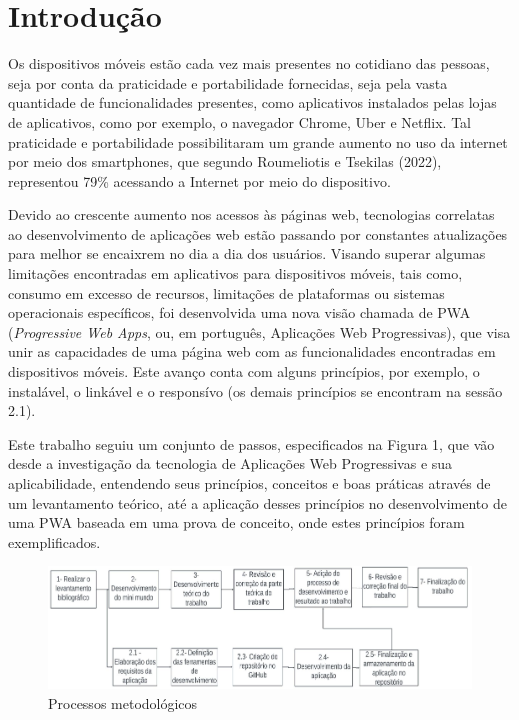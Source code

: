 \documentclass[12pt]{article}
\begin{document}
\section{Introdução}

Os dispositivos móveis estão cada vez mais presentes no cotidiano das pessoas, seja por conta da praticidade e portabilidade fornecidas, seja pela vasta quantidade de funcionalidades presentes, como aplicativos instalados pelas lojas de aplicativos, como por exemplo, o navegador Chrome, Uber e Netflix. Tal praticidade e portabilidade possibilitaram um grande aumento no uso da internet por meio dos smartphones, que segundo Roumeliotis e Tsekilas (2022), representou 79\% acessando a Internet por meio do dispositivo.

Devido ao crescente aumento nos acessos às páginas web, tecnologias correlatas ao desenvolvimento de aplicações web estão passando por constantes atualizações para melhor se encaixrem no dia a dia dos usuários. Visando superar algumas limitações encontradas em aplicativos para dispositivos móveis, tais como, consumo em excesso de recursos, limitações de plataformas ou sistemas operacionais específicos, foi desenvolvida uma nova visão chamada de PWA (\textit{Progressive Web Apps}, ou, em português, Aplicações Web Progressivas), que visa unir as capacidades de uma página web com as funcionalidades encontradas em dispositivos móveis. Este avanço conta com alguns princípios, por exemplo, o instalável, o linkável e o responsívo (os demais princípios se encontram na sessão 2.1).

Este trabalho seguiu um conjunto de passos, especificados na Figura 1, que vão desde a investigação da tecnologia de Aplicações Web Progressivas e sua aplicabilidade, entendendo seus princípios, conceitos e boas práticas através de um levantamento teórico, até a aplicação desses princípios no desenvolvimento de uma PWA baseada em uma prova de conceito, onde estes princípios foram exemplificados.

\begin{figure}[ht]
\centering
\includegraphics[width=1\textwidth]{imagens/processos.png}
\caption{Processos metodológicos}
\label{fig:processos}
\end{figure}
\end{document}

